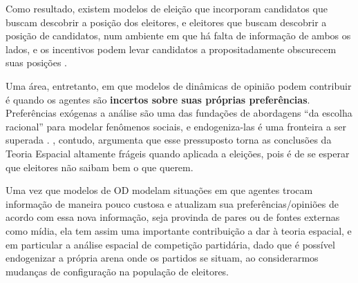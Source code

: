 Como resultado, existem modelos de eleição que incorporam candidatos que buscam
descobrir a posição dos eleitores, e eleitores que buscam descobrir a posição de
candidatos, num ambiente em que há falta de informação de ambos os lados, e os
incentivos podem levar candidatos a propositadamente obscurecem suas posições
\cite{downs1957economic}.

Uma área, entretanto, em que modelos de dinâmicas de opinião podem contribuir é
quando os agentes são \textbf{incertos sobre suas próprias preferências}.
Preferências exógenas a análise são uma das fundações de abordagens ``da escolha
racional'' para modelar fenômenos sociais, e endogeniza-las é uma fronteira a
ser superada \cite{gintis2009bounds,bowles2009microeconomics}.
, contudo, argumenta que esse pressuposto torna
as conclusões da Teoria Espacial altamente frágeis quando aplicada a eleições,
pois é de se esperar que eleitores não saibam bem o que querem.

Uma vez que modelos de OD modelam situações em que agentes trocam informação de
maneira pouco custosa e atualizam sua preferências/opiniões de acordo com essa
nova informação, seja provinda de pares ou de fontes externas como mídia, ela
tem assim uma importante contribuição a dar à teoria espacial, e em particular a
análise espacial de competição partidária, dado que é possível endogenizar a
própria arena onde os partidos se situam, ao considerarmos mudanças de
configuração na população de eleitores.






